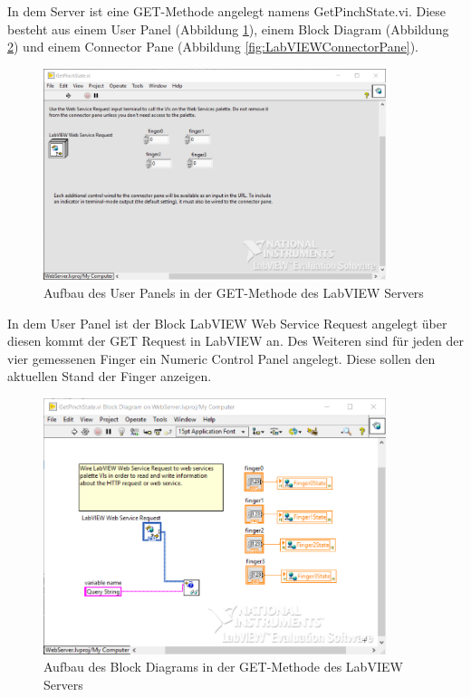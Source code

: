 \documentclass[a4paper,12pt,final]{article} %
\numberwithin{equation}{section} %
\numberwithin{figure}{section} %
\numberwithin{table}{section} %
\begin{document}
In dem Server ist eine GET-Methode angelegt namens GetPinchState.vi. Diese besteht aus einem User Panel (Abbildung \ref{fig:LabVIEWuserPanel}), einem Block Diagram (Abbildung \ref{fig:LabVIEWBlockDia}) und einem Connector Pane (Abbildung \ref{fig:LabVIEWConnectorPane}).
\begin{figure}[H]
	\begin{center}
		\includegraphics[width=10cm]{Bilder/UserPanel.png}
		\caption{Aufbau des User Panels in der GET-Methode des LabVIEW Servers}
		\label{fig:LabVIEWuserPanel}
	\end{center}
\end{figure}  
In dem User Panel ist der Block LabVIEW Web Service Request angelegt über diesen kommt der GET Request in LabVIEW an.
Des Weiteren sind für jeden der vier gemessenen Finger ein Numeric Control Panel angelegt. Diese sollen den aktuellen Stand der Finger anzeigen.
\begin{figure}[H]
	\begin{center}
		\includegraphics[width=10cm]{Bilder/BlockDiagram.png}
		\caption{Aufbau des Block Diagrams in der GET-Methode des LabVIEW Servers}
		\label{fig:LabVIEWBlockDia}
	\end{center}
\end{figure}
\end{document}
